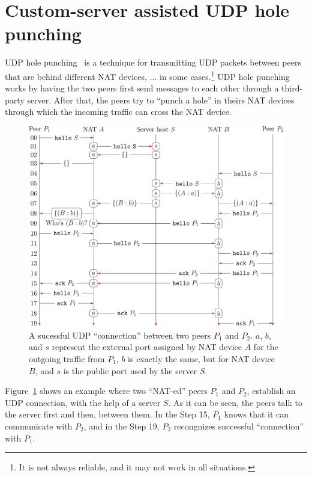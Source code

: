 \section{Custom-server assisted UDP hole punching}

UDP hole punching~\cite{srisuresh2008state} is a technique for
transmitting UDP packets between peers that are behind different NAT
devices, ... in some cases.\footnote{It is not always reliable, and it
  may not work in all situations.} UDP hole punching works by having
the two peers first send messages to each other through a third-party
server. After that, the peers try to ``punch a hole'' in theirs NAT
devices through which the incoming traffic can cross the NAT device.

\begin{figure}
  \includegraphics{graphics/UDP_Hole_Punching_RCN}
  \caption{A sucessful UDP ``connection'' between two peers $P_1$ and
    $P_2$. $a$, $b$, and $s$ represent the external port assigned by
    NAT device $A$ for the outgoing traffic from $P_1$, $b$ is exactly
    the same, but for NAT device $B$, and $s$ is the public port used
    by the server $S$.}
  \label{fig:UHP}
\end{figure}

Figure~\ref{fig:UHP} shows an example where two ``NAT-ed'' peers $P_1$
and $P_2$, establish an UDP connection, with the help of a server
$S$. As it can be seen, the peers talk to the server first and then,
between them. In the Step 15, $P_1$ knows that it can communicate with
$P_2$, and in the Step 19, $P_2$ recongnizes successful ``connection''
with $P_1$.

